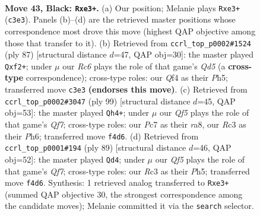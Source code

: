 \documentclass[11pt]{article}
\begin{document}
\clearpage

\begin{figure}[p]\centering
\begin{subfigure}{0.46\textwidth}\centering
\resizebox{\linewidth}{!}{%
\newchessgame
\chessboard[
  setfen={6k1/2p2p2/8/6P1/2P1Pq2/2r1Q2K/8/8 b - - 1 43},
  showmover=false,
  pgfstyle=straightmove, color=movearrow, markmove={c3-e3}
]}
\caption{}
\end{subfigure}\hfill
\begin{subfigure}{0.46\textwidth}\centering
\resizebox{\linewidth}{!}{%
\newchessgame
\chessboard[
  setfen={8/5k2/p5p1/7p/PP1q4/6P1/5Q2/6K1 b - - 2 44},
  showmover=false,
  pgfstyle=straightmove, color=movearrow, markmove={d4-f2}
]}
\caption{}
\end{subfigure}
\\[4pt]
\begin{subfigure}{0.46\textwidth}\centering
\resizebox{\linewidth}{!}{%
\newchessgame
\chessboard[
  setfen={R7/6pk/7p/8/1p6/8/1P3qP1/6QK b - - 0 50},
  showmover=false,
  pgfstyle=straightmove, color=movearrow, markmove={f2-h4}
]}
\caption{}
\end{subfigure}\hfill
\begin{subfigure}{0.46\textwidth}\centering
\resizebox{\linewidth}{!}{%
\newchessgame
\chessboard[
  setfen={8/8/5pk1/P1p4p/8/6P1/5qQK/8 b - - 1 45},
  showmover=false,
  pgfstyle=straightmove, color=movearrow, markmove={f2-d4}
]}
\caption{}
\end{subfigure}
\caption{\textbf{Move 43, Black: \texttt{Rxe3+}.} (a) Our position; Melanie plays \texttt{Rxe3+} (\texttt{c3e3}). Panels (b)--(d) are the retrieved master positions whose correspondence most drove this move (highest QAP objective among those that transfer to it). (b) Retrieved from \texttt{ccrl\_top\_p0002\#1524} (ply 87) [structural distance $d$=47, QAP obj=30]: the master played \texttt{Qxf2+}; under $\mu$ our \emph{Rc6} plays the role of that game's \emph{Qd5} (a \textbf{cross-type} correspondence); cross-type roles: our \emph{Q}f4 as their \emph{P}h5; transferred move \texttt{c3e3} \textbf{(endorses this move)}. (c) Retrieved from \texttt{ccrl\_top\_p0002\#3047} (ply 99) [structural distance $d$=45, QAP obj=53]: the master played \texttt{Qh4+}; under $\mu$ our \emph{Qf5} plays the role of that game's \emph{Qf7}; cross-type roles: our \emph{P}c7 as their \emph{r}a8, our \emph{R}c3 as their \emph{P}h6; transferred move \texttt{f4d6}. (d) Retrieved from \texttt{ccrl\_top\_p0001\#194} (ply 89) [structural distance $d$=46, QAP obj=52]: the master played \texttt{Qd4}; under $\mu$ our \emph{Qf5} plays the role of that game's \emph{Qf7}; cross-type roles: our \emph{R}c3 as their \emph{P}h5; transferred move \texttt{f4d6}. Synthesis: 1 retrieved analog transferred to \texttt{Rxe3+} (summed QAP objective 30, the strongest correspondence among the candidate moves); Melanie committed it via the \texttt{search} selector.}
\label{fig:thought-m85}
\end{figure}
\end{document}
